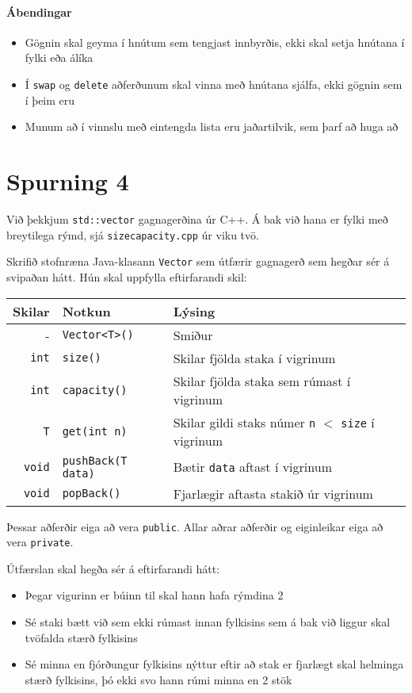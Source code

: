 \documentclass{article}
\begin{document}
\paragraph{Ábendingar} 

\begin{itemize}
 \item Gögnin skal geyma í hnútum sem tengjast innbyrðis, ekki skal setja hnútana í fylki eða álíka
 \item Í \texttt{swap} og \texttt{delete} aðferðunum skal vinna með hnútana sjálfa, ekki gögnin sem í þeim eru
 \item Munum að í vinnslu með eintengda lista eru jaðartilvik, sem þarf að huga að
\end{itemize}

\section{Spurning 4}
Við þekkjum \texttt{std::vector} gagnagerðina úr C++. Á bak við hana er fylki með breytilega rýmd, sjá \texttt{sizecapacity.cpp} úr viku tvö.

Skrifið stofnræna Java-klasann \texttt{Vector} sem útfærir gagnagerð sem hegðar sér á svipaðan hátt. Hún skal uppfylla eftirfarandi skil:

\begin{center}
\begin{tabular}{rll}
\toprule
Skilar&Notkun&Lýsing\\
\midrule
-&\texttt{Vector<T>()}& Smiður\\
\texttt{int}&\texttt{size()}&Skilar fjölda staka í vigrinum\\
\texttt{int}&\texttt{capacity()}&Skilar fjölda staka sem rúmast í vigrinum\\
\texttt{T}&\texttt{get(int n)}&Skilar gildi staks númer \texttt{n} $<$ \texttt{size} í vigrinum\\
\texttt{void}&\texttt{pushBack(T data)}&Bætir \texttt{data} aftast í vigrinum\\
\texttt{void}&\texttt{popBack()}&Fjarlægir aftasta stakið úr vigrinum\\
\bottomrule
\end{tabular}
\end{center}
Þessar aðferðir eiga að vera \texttt{public}. Allar aðrar aðferðir og eiginleikar eiga að vera \texttt{private}.

Útfærslan skal hegða sér á eftirfarandi hátt: 
\begin{itemize}
 \item Þegar vigurinn er búinn til skal hann hafa rýmdina 2
 \item Sé staki bætt við sem ekki rúmast innan fylkisins sem á bak við liggur skal tvöfalda stærð fylkisins
 \item Sé minna en fjórðungur fylkisins nýttur eftir að stak er fjarlægt skal helminga stærð fylkisins, þó ekki svo hann rúmi minna en 2 stök
\end{itemize}
\end{document}
